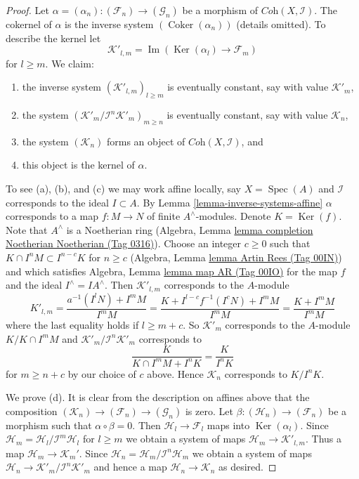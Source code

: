 \documentclass{amsart}
\theoremstyle{plain}
\theoremstyle{definition}
\theoremstyle{remark}
\numberwithin{equation}{subsection}
\def\Spec{\mathop{\mathrm{Spec}}}
\def\Ker{\mathop{\mathrm{Ker}}}
\def\Im{\mathop{\mathrm{Im}}}
\def\Coker{\mathop{\mathrm{Coker}}}
\begin{document}
\begin{proof}
Let $\alpha =(\alpha_n) : (\mathcal{F}_n) \to (\mathcal{G}_n)$ be a morphism of
$\textit{Coh}(X, \mathcal{I})$. The cokernel of $\alpha$ is the inverse system
$(\Coker(\alpha_n))$ (details omitted). To describe the kernel let
$$
\mathcal{K}'_{l, m} = \Im(\Ker(\alpha_l) \to \mathcal{F}_m)
$$
for $l \geq m$.
We claim:
\begin{enumerate}
\item[(a)] the inverse system $(\mathcal{K}'_{l, m})_{l \geq m}$ is
eventually constant, say with value $\mathcal{K}'_m$,
\item[(b)] the system $(\mathcal{K}'_m/\mathcal{I}^n\mathcal{K}'_m)_{m \geq n}$
is eventually constant, say with value $\mathcal{K}_n$,
\item[(c)] the system $(\mathcal{K}_n)$ forms an object of
$\textit{Coh}(X, \mathcal{I})$, and
\item[(d)] this object is the kernel of $\alpha$.
\end{enumerate}
To see (a), (b), and (c) we may work affine locally, say $X = \Spec(A)$
and $\mathcal{I}$ corresponds to the ideal $I \subset A$. By
Lemma \ref{lemma-inverse-systems-affine}
$\alpha$ corresponds to a map $f : M \to N$ of finite $A^\wedge$-modules.
Denote $K = \Ker(f)$. Note that $A^\wedge$ is a Noetherian
ring (Algebra, Lemma \href{https://stacks.math.columbia.edu/tag/0316}{lemma completion Noetherian Noetherian (Tag 0316)}).
Choose an integer $c \geq 0$ such that
$K \cap I^n M \subset I^{n - c}K$ for $n \geq c$
(Algebra, Lemma \href{https://stacks.math.columbia.edu/tag/00IN}{lemma Artin Rees (Tag 00IN)})
and which satisfies Algebra, Lemma \href{https://stacks.math.columbia.edu/tag/00IO}{lemma map AR (Tag 00IO)}
for the map $f$ and the ideal $I^\wedge = IA^\wedge$. Then
$\mathcal{K}'_{l, m}$ corresponds to the $A$-module
$$
K'_{l, m} = \frac{a^{-1}(I^lN) + I^mM}{I^mM} =
\frac{K + I^{l - c}f^{-1}(I^cN) + I^mM}{I^mM} =
\frac{K + I^mM}{I^mM}
$$
where the last equality holds if $l \geq m + c$. So $\mathcal{K}'_m$
corresponds to the $A$-module $K/K \cap I^mM$ and
$\mathcal{K}'_m/\mathcal{I}^n\mathcal{K}'_m$ corresponds to
$$
\frac{K}{K \cap I^mM + I^nK} = \frac{K}{I^nK}
$$
for $m \geq n + c$ by our choice of $c$ above. Hence $\mathcal{K}_n$
corresponds to $K/I^nK$.

\medskip\noindent
We prove (d). It is clear from the description on affines above that
the composition $(\mathcal{K}_n) \to (\mathcal{F}_n) \to (\mathcal{G}_n)$
is zero. Let $\beta : (\mathcal{H}_n) \to (\mathcal{F}_n)$
be a morphism such that $\alpha \circ \beta = 0$. Then
$\mathcal{H}_l \to \mathcal{F}_l$ maps into $\Ker(\alpha_l)$.
Since $\mathcal{H}_m = \mathcal{H}_l/\mathcal{I}^m\mathcal{H}_l$
for $l \geq m$ we obtain a system of maps
$\mathcal{H}_m \to \mathcal{K}'_{l, m}$. Thus a map
$\mathcal{H}_m \to \mathcal{K}_m'$. Since
$\mathcal{H}_n = \mathcal{H}_m/\mathcal{I}^n\mathcal{H}_m$ we obtain
a system of maps $\mathcal{H}_n \to \mathcal{K}'_m/\mathcal{I}^n\mathcal{K}'_m$
and hence a map $\mathcal{H}_n \to \mathcal{K}_n$ as desired.


\end{proof}
\end{document}
